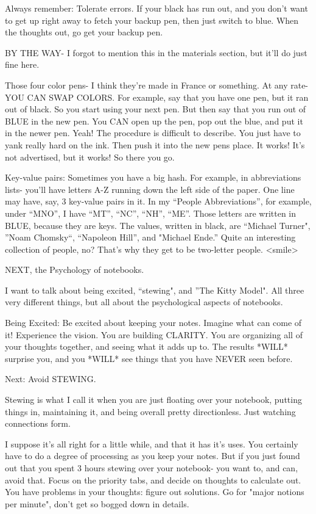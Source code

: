 \documentclass[oneside]{book}
\begin{document}
Always remember: Tolerate errors. If your black has run out, and you
don't want to get up right away to fetch your backup pen, then just
switch to blue. When the thoughts out, go get your backup pen.

BY THE WAY- I forgot to mention this in the materials section, but
it'll do just fine here.

Those four color pens- I think they're made in France or something. At
any rate- YOU CAN SWAP COLORS. For example, say that you have one pen,
but it ran out of black. So you start using your next pen. But then
say that you run out of BLUE in the new pen. You CAN open up the pen,
pop out the blue, and put it in the newer pen. Yeah! The procedure is
difficult to describe. You just have to yank really hard on the
ink. Then push it into the new pens place. It works! It's not
advertised, but it works! So there you go.

Key-value pairs: Sometimes you have a big hash. For example, in
abbreviations lists- you'll have letters A-Z running down the left
side of the paper. One line may have, say, 3 key-value pairs in it. In
my ``People Abbreviations'', for example, under ``MNO'', I have ``MT'',
``NC'', ``NH'', ``ME''. Those letters are written in BLUE, because they are
keys. The values, written in black, are ``Michael Turner", ''Noam
Chomsky``, ``Napoleon Hill'', and "Michael Ende.'' Quite an interesting
collection of people, no? That's why they get to be two-letter
people. <smile>

NEXT, the Psychology of notebooks.

I want to talk about being excited, ``stewing", and ''The Kitty
Model". All three very different things, but all about the
psychological aspects of notebooks.

Being Excited: Be excited about keeping your notes. Imagine what can
come of it! Experience the vision. You are building CLARITY. You are
organizing all of your thoughts together, and seeing what it adds up
to. The results *WILL* surprise you, and you *WILL* see things that
you have NEVER seen before.

Next: Avoid STEWING.

Stewing is what I call it when you are just floating over your
notebook, putting things in, maintaining it, and being overall pretty
directionless. Just watching connections form.

I suppose it's all right for a little while, and that it has it's
uses. You certainly have to do a degree of processing as you keep your
notes. But if you just found out that you spent 3 hours stewing over
your notebook- you want to, and can, avoid that. Focus on the priority
tabs, and decide on thoughts to calculate out. You have problems in
your thoughts: figure out solutions. Go for "major notions per
minute", don't get so bogged down in details.
\end{document}

